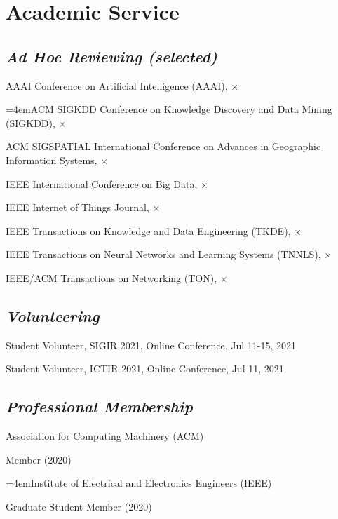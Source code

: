 
\vspace{-8pt}
\section*{Academic Service}
\vspace{-4pt}


\subsection*{\textnormal{\textit{Ad Hoc Reviewing (selected)}}}
\vspace{-4pt}
\indent

AAAI Conference on Artificial Intelligence (AAAI), $\times$

\hangindent=4emACM SIGKDD Conference on Knowledge Discovery and Data Mining (SIGKDD), $\times$

ACM SIGSPATIAL International Conference on Advances in Geographic Information Systems, $\times$

IEEE International Conference on Big Data, $\times$

IEEE Internet of Things Journal, $\times$

IEEE Transactions on Knowledge and Data Engineering (TKDE), $\times$

IEEE Transactions on Neural Networks and Learning Systems (TNNLS), $\times$

IEEE/ACM Transactions on Networking (TON), $\times$

\subsection*{\textnormal{\textit{Volunteering}}}
\vspace{-4pt}
\indent 

Student Volunteer, SIGIR 2021, Online Conference, Jul 11-15, 2021

Student Volunteer, ICTIR 2021, Online Conference, Jul 11, 2021

\subsection*{\textnormal{\textit{Professional Membership}}}
\vspace{-4pt}
\indent 

Association for Computing Machinery (ACM)  

\hspace{2em}Member (2020)

\hangindent=4emInstitute of Electrical and Electronics Engineers (IEEE)

\hspace{2em}Graduate Student Member (2020)